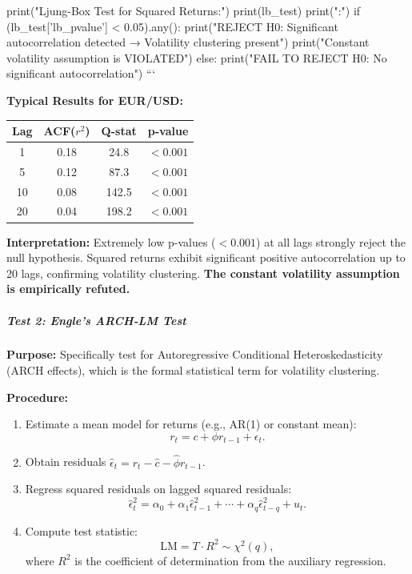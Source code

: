 print("Ljung-Box Test for Squared Returns:")
print(lb_test)
print("\nConclusion:")
if (lb_test['lb_pvalue'] < 0.05).any():
print("REJECT H0: Significant autocorrelation detected → Volatility clustering present")
print("Constant volatility assumption is VIOLATED")
else:
print("FAIL TO REJECT H0: No significant autocorrelation")
```

\textbf{Typical Results for EUR/USD:}

\begin{center}
	\begin{tabular}{|c|c|c|c|}
		\hline
		\textbf{Lag} & \textbf{ACF($r^2$)} & \textbf{Q-stat} & \textbf{p-value} \\
		\hline
		1 & 0.18 & 24.8 & $<0.001$ \\
		5 & 0.12 & 87.3 & $<0.001$ \\
		10 & 0.08 & 142.5 & $<0.001$ \\
		20 & 0.04 & 198.2 & $<0.001$ \\
		\hline
	\end{tabular}
\end{center}

\textbf{Interpretation:} Extremely low p-values ($< 0.001$) at all lags strongly reject the null hypothesis. Squared returns exhibit significant positive autocorrelation up to 20 lags, confirming volatility clustering. \textbf{The constant volatility assumption is empirically refuted.}

\subparagraph{Test 2: Engle's ARCH-LM Test}

\textbf{Purpose:} Specifically test for Autoregressive Conditional Heteroskedasticity (ARCH effects), which is the formal statistical term for volatility clustering.

\textbf{Procedure:}

\begin{enumerate}
	\item Estimate a mean model for returns (e.g., AR(1) or constant mean):
	\begin{equation}
		r_t = c + \phi r_{t-1} + \epsilon_t.
	\end{equation}
	
	\item Obtain residuals $\hat{\epsilon}_t = r_t - \hat{c} - \hat{\phi} r_{t-1}$.
	
	\item Regress squared residuals on lagged squared residuals:
	\begin{equation}
		\hat{\epsilon}_t^2 = \alpha_0 + \alpha_1 \hat{\epsilon}_{t-1}^2 + \cdots + \alpha_q \hat{\epsilon}_{t-q}^2 + u_t.
	\end{equation}
	
	\item Compute test statistic:
	\begin{equation}
		\text{LM} = T \cdot R^2 \sim \chi^2(q),
	\end{equation}
	where $R^2$ is the coefficient of determination from the auxiliary regression.
\end{enumerate}

